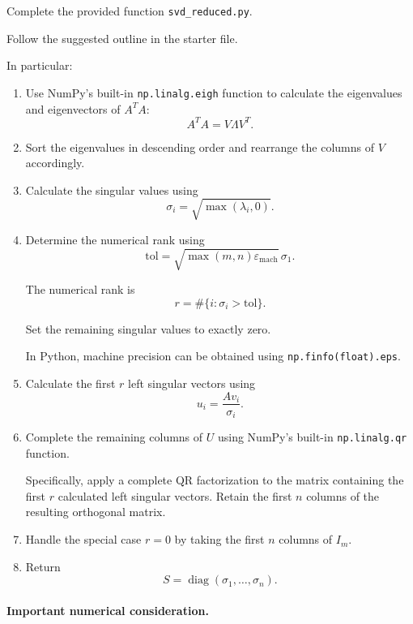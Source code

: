 \documentclass{ximera}
\begin{document}
Complete the provided function \texttt{svd\_reduced.py}.

Follow the suggested outline in the starter file.

In particular:

\begin{enumerate}

    \item Use NumPy's built-in \texttt{np.linalg.eigh} function to
    calculate the eigenvalues and eigenvectors of $A^TA$:
    \[
    A^TA=V\Lambda V^T.
    \]

    \item Sort the eigenvalues in descending order and rearrange
    the columns of $V$ accordingly.

    \item Calculate the singular values using
    \[
    \sigma_i=\sqrt{\max(\lambda_i,0)}.
    \]

    \item Determine the numerical rank using
    \[
    \text{tol}=
    \sqrt{\max(m,n)\varepsilon_{\mathrm{mach}}}\,\sigma_1.
    \]

    The numerical rank is
    \[
    r=\#\{i:\sigma_i>\text{tol}\}.
    \]

    Set the remaining singular values to exactly zero.

    In Python, machine precision can be obtained using
    \texttt{np.finfo(float).eps}.

    \item Calculate the first $r$ left singular vectors using
    \[
    u_i=\frac{Av_i}{\sigma_i}.
    \]

    \item Complete the remaining columns of $U$ using NumPy's
    built-in \texttt{np.linalg.qr} function.

    Specifically, apply a complete QR factorization to the
    matrix containing the first $r$ calculated left singular
    vectors. Retain the first $n$ columns of the resulting
    orthogonal matrix.

    \item Handle the special case $r=0$ by taking the first
    $n$ columns of $I_m$.

    \item Return
    \[
    S=\operatorname{diag}(\sigma_1,\ldots,\sigma_n).
    \]

\end{enumerate}

\paragraph{Important numerical consideration.}
\end{document}
